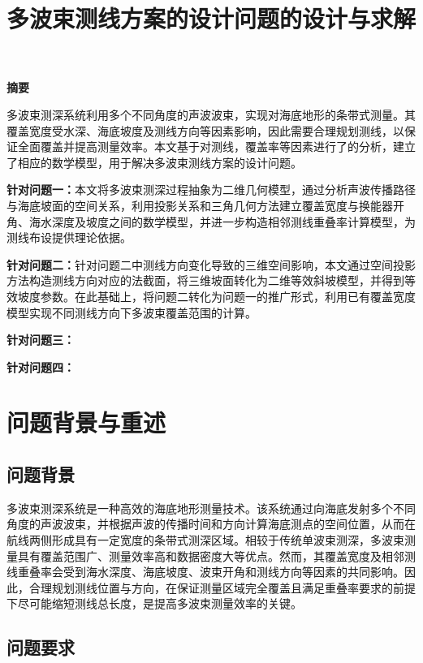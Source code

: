 \documentclass[UTF-8,a4paper,zihao=-4]{ctexart}
\makeatletter
\renewcommand{\maketitle}{
    \begin{center}
        \vspace*{-2cm}
        {\zihao{2}\heiti\@title\par}
    \end{center}
}
\renewenvironment{abstract}
{
    \begin{center}
        {\zihao{-3}\textbf{摘要}}
    \end{center}
    \zihao{-4}
}
{}
\makeatother
\begin{document}
\title{多波束测线方案的设计问题的设计与求解}
\date{}
\maketitle


\begin{abstract}
多波束测深系统利用多个不同角度的声波波束，实现对海底地形的条带式测量。其覆盖宽度受水深、海底坡度及测线方向等因素影响，因此需要合理规划测线，以保证全面覆盖并提高测量效率。本文基于对测线，覆盖率等因素进行了的分析，建立了相应的数学模型，用于解决多波束测线方案的设计问题。

\textbf{针对问题一：}本文将多波束测深过程抽象为二维几何模型，通过分析声波传播路径与海底坡面的空间关系，利用投影关系和三角几何方法建立覆盖宽度与换能器开角、海水深度及坡度之间的数学模型，并进一步构造相邻测线重叠率计算模型，为测线布设提供理论依据。

\textbf{针对问题二：}针对问题二中测线方向变化导致的三维空间影响，本文通过空间投影方法构造测线方向对应的法截面，将三维坡面转化为二维等效斜坡模型，并得到等效坡度参数。在此基础上，将问题二转化为问题一的推广形式，利用已有覆盖宽度模型实现不同测线方向下多波束覆盖范围的计算。

\textbf{针对问题三：}

\textbf{针对问题四：}


\end{abstract}

\newpage
\section{问题背景与重述}
\subsection{问题背景}
多波束测深系统是一种高效的海底地形测量技术。该系统通过向海底发射多个不同角度的声波波束，并根据声波的传播时间和方向计算海底测点的空间位置，从而在航线两侧形成具有一定宽度的条带式测深区域。相较于传统单波束测深，多波束测量具有覆盖范围广、测量效率高和数据密度大等优点。然而，其覆盖宽度及相邻测线重叠率会受到海水深度、海底坡度、波束开角和测线方向等因素的共同影响。因此，合理规划测线位置与方向，在保证测量区域完全覆盖且满足重叠率要求的前提下尽可能缩短测线总长度，是提高多波束测量效率的关键。

\subsection{问题要求}
\end{document}
